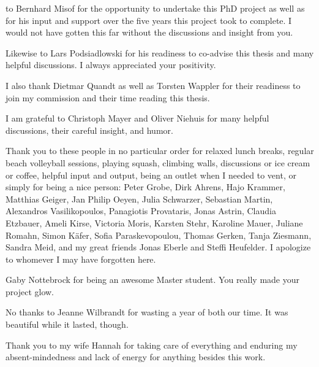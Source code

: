 
 to Bernhard Misof for the opportunity to
undertake this PhD project as well as for his input and support over the
five years this project took to complete. I would not have gotten this
far without the discussions and insight from you.

Likewise to Lars Podsiadlowski for his readiness to co-advise this
thesis and many helpful discussions. I always appreciated your
positivity.

I also thank Dietmar Quandt as well as Torsten Wappler for their
readiness to join my commission and their time reading this thesis.

I am grateful to Christoph Mayer and Oliver Niehuis for many helpful
discussions, their careful insight, and humor.

Thank you to these people in no particular order for relaxed lunch
breaks, regular beach volleyball sessions, playing squash, climbing
walls, discussions or ice cream or coffee, helpful input and output,
being an outlet when I needed to vent, or simply for being a nice
person:
Peter Grobe, Dirk Ahrens, Hajo Krammer, Matthias Geiger, Jan Philip
Oeyen, Julia Schwarzer, Sebastian Martin, Alexandros Vasilikopoulos,
Panagiotis Provataris, Jonas Astrin, Claudia Etzbauer, Ameli Kirse,
Victoria Moris, Karsten Stehr, Karoline Mauer, Juliane
Romahn, Simon K\"afer, Sofia Paraskevopoulou, Thomas Gerken, Tanja
Ziesmann, Sandra Meid, and my great friends Jonas Eberle and Steffi
Heufelder. I apologize to whomever I may have forgotten here.

Gaby Nottebrock for being an awesome Master student. You really made
your project glow.

No thanks to Jeanne Wilbrandt for wasting a year of both our time. It
was beautiful while it lasted, though.

Thank you to my wife Hannah for taking care of everything and enduring
my absent-mindedness and lack of energy for anything besides this
work. 
